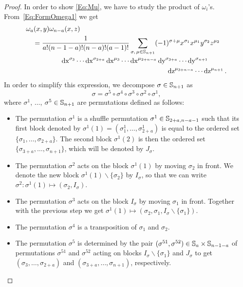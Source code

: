\documentclass[\MainFolder/Text.tex]{subfiles}
\begin{document}
\begin{proof}
In order to show \eqref{Eq:Mu}, we have to study the product of $\omega_i$'s.
From~\eqref{Eq:FormOmega1} we get
\begin{equation}\label{Eq:GenProd}
\begin{aligned}
&\omega_a(x,y)\omega_{n-a}(x,z)\\
&\quad =\begin{multlined}[t] \frac{1}{a! (n-1-a)! (n-a)! (a-1)!} \sum_{\substack{\sigma,\,\mu\in \Perm_{n+1}}} (-1)^{\sigma + \mu} x^{\sigma_1} x^{\mu_1} y^{\sigma_2} z^{\mu_2}  \\ \Diff{x}^{\sigma_3} \dotsm \Diff{x}^{\sigma_{2+a}} \Diff{x}^{\mu_3}\dotsm\Diff{x}^{\mu_{2+n-a}} 
\Diff{y}^{\sigma_{3+a}}\dotsm \Diff{y}^{\sigma_{n+1}}\\\Diff{z}^{\mu_{3+n-a}}\dotsm \Diff{z}^{\mu_{n+1}}.
\end{multlined}
\end{aligned}
\end{equation}
In order to simplify this expression, we decompose $\sigma\in \mathbb{S}_{n+1}$ as
\begin{equation} \label{Eq:Decomp}
 \sigma = \sigma^5 \circ \sigma^4 \circ \sigma^3 \circ \sigma^2 \circ \sigma^1,
 \end{equation}
where $\sigma^1$, $\dotsc$, $\sigma^5\in \mathbb{S}_{n+1}$ are permutations defined as follows:
\begin{itemize}
 \item The permutation $\sigma^1$ is a shuffle permutation $\sigma^1 \in \mathbb{S}_{2+a,n-a-1}$ such that its first block denoted by $\sigma^1(1) = (\sigma^1_1,\dotsc,\sigma^1_{2+a})$ is equal to the ordered set $\{\sigma_1, \dotsc, \sigma_{2+a}\}$.
 The second block $\sigma^1(2)$ is then the ordered set $\{\sigma_{3+a},\dotsc,\sigma_{n+1}\}$, which will be denoted by $J_\sigma$.
 \item The permutation $\sigma^2$ acts on the block $\sigma^1(1)$ by moving $\sigma_2$ in front.
 We denote the new block $\sigma^1(1)\backslash\{\sigma_2\}$ by $I_\sigma$, so that we can write $\sigma^2 : \sigma^1(1) \mapsto (\sigma_2, I_\sigma)$. 
 \item The permutation $\sigma^3$ acts on the block $I_\sigma$ by moving $\sigma_1$ in front.
 Together with the previous step we get $\sigma^1(1)\mapsto (\sigma_2, \sigma_1,I_\sigma\backslash\{\sigma_1\})$.
 \item The permutation $\sigma^4$ is a transposition of $\sigma_1$ and $\sigma_2$.
 \item The permutation $\sigma^5$ is determined by the pair $(\sigma^{51},\sigma^{52}) \in \mathbb{S}_{a} \times \mathbb{S}_{n-1-a}$ of permutations $\sigma^{51}$ and $\sigma^{52}$ acting on blocks $I_\sigma\backslash\{\sigma_1\}$ and $J_\sigma$ to get $(\sigma_3,\dotsc,\sigma_{2+a})$ and $(\sigma_{3+a},\dotsc,\sigma_{n+1})$, respectively.
\end{itemize}




\end{proof}
\end{document}

